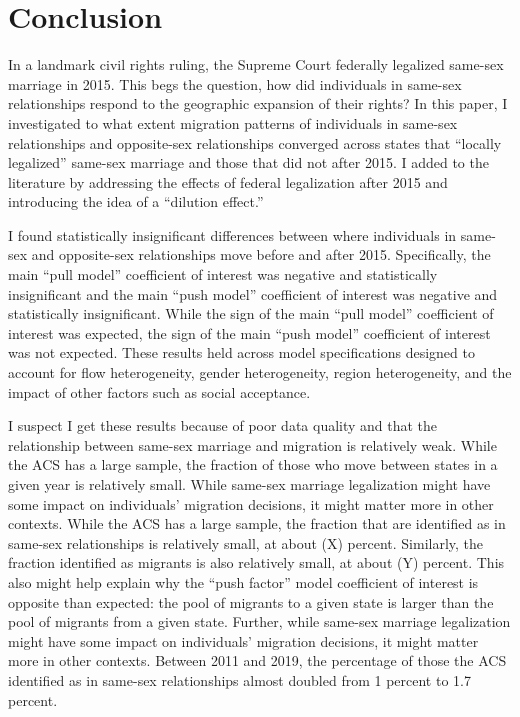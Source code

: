 \documentclass[12pt,letterpaper]{article}
\begin{document}
\section{Conclusion}

In a landmark civil rights ruling, the Supreme Court federally legalized same-sex marriage in 2015. This begs the question, how did individuals in same-sex relationships respond to the geographic expansion of their rights? In this paper, I investigated to what extent migration patterns of individuals in same-sex relationships and opposite-sex relationships converged across states that “locally legalized” same-sex marriage and those that did not after 2015. I added to the literature by addressing the effects of federal legalization after 2015 and introducing the idea of a “dilution effect.”

I found statistically insignificant differences between where individuals in same-sex and opposite-sex relationships move before and after 2015. Specifically, the main “pull model” coefficient of interest was negative and statistically insignificant and the main “push model” coefficient of interest was negative and statistically insignificant. While the sign of the main “pull model” coefficient of interest was expected, the sign of the main “push model” coefficient of interest was not expected. These results held across model specifications designed to account for flow heterogeneity, gender heterogeneity, region heterogeneity, and the impact of other factors such as social acceptance. 

I suspect I get these results because of poor data quality and that the relationship between same-sex marriage and migration is relatively weak. While the ACS has a large sample, the fraction of those who move between states in a given year is relatively small. While same-sex marriage legalization might have some impact on individuals’ migration decisions, it might matter more in other contexts. While the ACS has a large sample, the fraction that are identified as in same-sex relationships is relatively small, at about (X) percent. Similarly, the fraction identified as migrants is also relatively small, at about (Y) percent. This also might help explain why the “push factor” model coefficient of interest is opposite than expected: the pool of migrants to a given state is larger than the pool of migrants from a given state. Further, while same-sex marriage legalization might have some impact on individuals’ migration decisions, it might matter more in other contexts. Between 2011 and 2019, the percentage of those the ACS identified as in same-sex relationships almost doubled from 1 percent to 1.7 percent.
\end{document}
